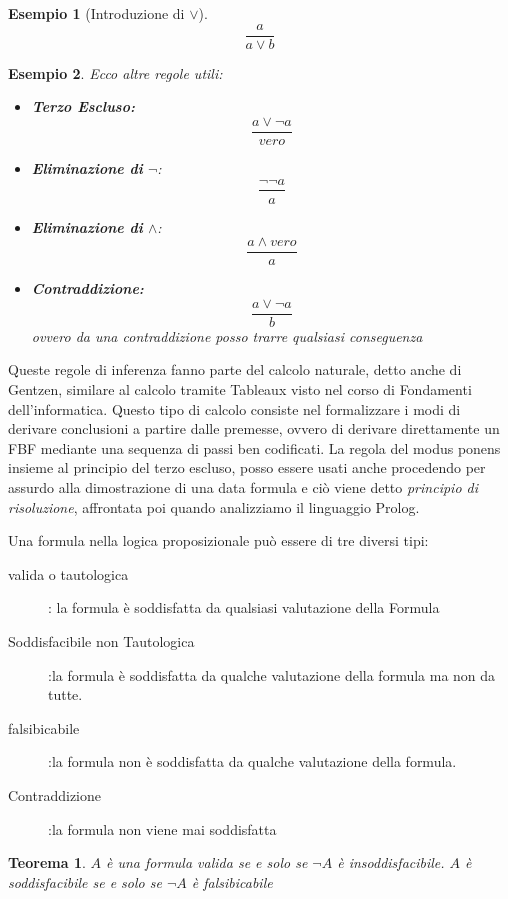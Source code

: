 \documentclass[a4paper]{report}
\newtheorem{teorema}{Teorema}[chapter]
\newtheorem{esempio}{Esempio}
\begin{document}
\begin{esempio}[Introduzione di $\lor$]
$$\frac{a}{a \lor b}$$
\end{esempio}

\begin{esempio}
Ecco altre regole utili:
\begin{itemize}
\item \textbf{Terzo Escluso:}
$$\frac{a \lor \neg a}{vero}$$
\item \textbf{Eliminazione di} $\neg$:
$$\frac{\neg \neg a}{a}$$
\item \textbf{Eliminazione di} $\land$:
$$\frac{a \land vero}{a}$$
\item \textbf{Contraddizione:}
$$\frac{a \lor \neg a}{b}$$
ovvero da una contraddizione posso trarre qualsiasi conseguenza
\end{itemize}
\end{esempio}
Queste regole di inferenza fanno parte del calcolo naturale, detto anche di Gentzen, similare al calcolo tramite Tableaux visto nel corso
di Fondamenti dell'informatica.\newline
Questo tipo di calcolo consiste nel formalizzare i modi di derivare conclusioni a partire dalle premesse, ovvero di derivare direttamente un FBF
mediante una sequenza di passi ben codificati.
La regola del modus ponens  insieme al principio del terzo escluso, posso essere usati anche procedendo per assurdo alla dimostrazione
di una data formula e ciò viene detto \emph{principio di risoluzione}, affrontata poi quando analizziamo il linguaggio Prolog.


Una formula nella logica proposizionale può essere di tre diversi tipi:
\begin{description}
    \item[valida o tautologica]: la formula è soddisfatta da qualsiasi valutazione della Formula
    \item[Soddisfacibile non Tautologica]:la formula è soddisfatta da qualche valutazione
                        della formula ma non da tutte.
    \item[falsibicabile]:la formula non è soddisfatta da qualche valutazione della formula.
    \item[Contraddizione]:la formula non viene mai soddisfatta
\end{description}

\begin{teorema}
$A$ è una formula valida se e solo se $\neg A$ è insoddisfacibile.
$A$ è soddisfacibile se e solo se $\neg A$ è falsibicabile
\end{teorema}
\end{document}
